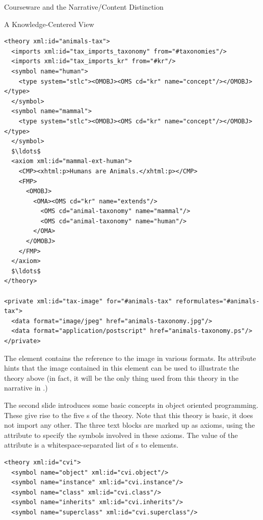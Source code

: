 \begin{tchapter}[id=courseware]{Courseware and the Narrative/Content Distinction}
\begin{tsection}[id=knowledge-centered]{A Knowledge-Centered View}
\begin{lstlisting}[label=lst:ann-tax,mathescape,
    caption={The {\omdoc} Representation for Slide 1 from {\myfigref{15-211}}},
    index={theory,axiom,symbol,CMP,FMP,OMA,OMOBJ,OMS,private,data}]
<theory xml:id="animals-tax">
  <imports xml:id="tax_imports_taxonomy" from="#taxonomies"/>
  <imports xml:id="tax_imports_kr" from="#kr"/>
  <symbol name="human">
    <type system="stlc"><OMOBJ><OMS cd="kr" name="concept"/></OMOBJ></type>
  </symbol>
  <symbol name="mammal">
    <type system="stlc"><OMOBJ><OMS cd="kr" name="concept"/></OMOBJ></type>
  </symbol>
  $\ldots$
  <axiom xml:id="mammal-ext-human">
    <CMP><xhtml:p>Humans are Animals.</xhtml:p></CMP>
    <FMP>
      <OMOBJ>
        <OMA><OMS cd="kr" name="extends"/>
          <OMS cd="animal-taxonomy" name="mammal"/>
          <OMS cd="animal-taxonomy" name="human"/>
        </OMA>
      </OMOBJ>
    </FMP>
  </axiom>
  $\ldots$
</theory>

<private xml:id="tax-image" for="#animals-tax" reformulates="#animals-tax">
  <data format="image/jpeg" href="animals-taxonomy.jpg"/>
  <data format="application/postscript" href="animals-taxonomy.ps"/>
</private>
\end{lstlisting}
The {} element contains the reference to the image in various
formats. Its {} attribute hints that the image
contained in this element can be used to illustrate the theory above (in fact, it
will be the only thing used from this theory in the narrative {\omdoc} in
{}.)

The second slide introduces some basic concepts in object oriented programming.  These
give rise to the five {s} of the theory. Note that this theory
is basic, it does not import any other. The three text blocks are marked up as axioms,
using the attribute {} to specify the symbols involved in these
axioms. The value of the {} attribute is a whitespace-separated list
of {s} to {} elements.

\begin{lstlisting}[label=lst:ann-oo,
    caption={The {\omdoc} Representation for Slide 2 from {\myfigref{15-211}}},
    index={theory,axiom,symbol,CMP,FMP,OMA,OMOBJ,OMS}]
<theory xml:id="cvi">
  <symbol name="object" xml:id="cvi.object"/>
  <symbol name="instance" xml:id="cvi.instance"/>
  <symbol name="class" xml:id="cvi.class"/>
  <symbol name="inherits" xml:id="cvi.inherits"/>
  <symbol name="superclass" xml:id="cvi.superclass"/>


\end{lstlisting}
\end{tsection}
\end{tchapter}
